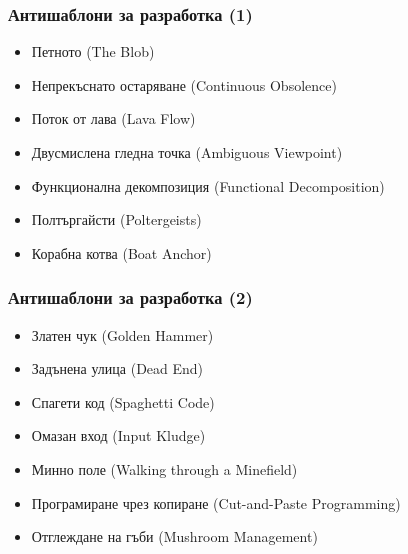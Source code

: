 \documentclass[alsotrans]{beamerswitch}
\begin{document}
\begin{frame}
  \frametitle{Антишаблони за разработка (1)}

  \begin{itemize}[<+->]
  \item Петното (The Blob)
  \item Непрекъснато остаряване (Continuous Obsolence)
  \item Поток от лава (Lava Flow)
  \item Двусмислена гледна точка (Ambiguous Viewpoint)
  \item Функционална декомпозиция (Functional Decomposition)
  \item Полтъргайсти (Poltergeists)
  \item Корабна котва (Boat Anchor)
  \end{itemize}
\end{frame}

\begin{frame}
  \frametitle{Антишаблони за разработка (2)}

  \begin{itemize}[<+->]
  \item Златен чук (Golden Hammer)
  \item Задънена улица (Dead End)
  \item Спагети код (Spaghetti Code)
  \item Омазан вход (Input Kludge)
  \item Минно поле (Walking through a Minefield)
  \item Програмиране чрез копиране (Cut-and-Paste Programming)
  \item Отглеждане на гъби (Mushroom Management)
  \end{itemize}
\end{frame}
\end{document}
